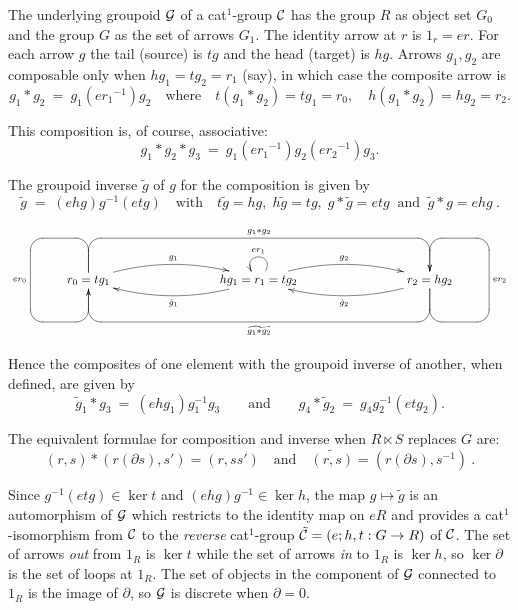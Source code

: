 The underlying groupoid $\mathcal{G}$  of a cat$^1$-group  $\mathcal{C}$ 
has the group $R$ as object set $G_0$ 
and the group $G$ as the set of arrows $G_1$. 
The identity arrow at  $r$  is  $1_r = er$. 
For each arrow  $g$  the tail (source) is  $tg$ and the head (target) is $hg$. 
Arrows  $g_1,g_2$  are composable only when  $hg_1 = tg_2 = r_1$ (say),
in which case the composite arrow is
\begin{equation} \label{eq:gpgpd-comp}
g_1 * g_2 ~=~ g_1(e{r_1}^{-1})g_2 
\quad\mbox{where}\quad
t(g_1 * g_2) = tg_1 = r_0, \quad
h(g_1 * g_2) = hg_2 = r_2.
\end{equation}

\noindent
This composition is, of course, associative:
$$
g_1*g_2*g_3 ~=~ g_1({er_1}^{-1})g_2({er_2}^{-1})g_3.
$$

\noindent
The groupoid inverse  $\tilde{g}$  of  $g$  for the composition is given by
$$
\tilde{g} \; = \; (ehg)g^{-1}(etg)
\quad \mbox{with} \quad  
t \tilde{g} = hg, \; h \tilde{g} = tg, \; g * \tilde{g} = etg  
\;\; \mbox{and} \;\;
\tilde{g} * g = ehg~.
$$  

$$
\xy
\xymatrix{
  &&&&&&&& \\
  &  r_0=tg_1 \ar `u[-1,-1] `[1,-1] `[1,0]_{er_0} `[0,0] [0,0]
            \ar@/^3ex/[rrr]^{g_1}
            \ar `u[-1,1] `[0,6]^{g_1 * g_2} [0,6]
  &&& hg_1=r_1=tg_2 \ar@/^3ex/[rrr]^{g_2}
                    \ar@/^3ex/[lll]^{\tilde{g}_1}
                    \ar@(ur,ul)_{er_1}
     &&& r_2=hg_2 \ar `d[1,1] `[-1,1] `[-1,0]_{er_2} `[0,0] [0,0]
                  \ar@/^3ex/[lll]^{\tilde{g}_2}
                  \ar `d[1,-1] `[0,-6]^{\widetilde{g_1 * g_2}} [0,-6] 
         & \\
  &&&&&&&& \\
}
\endxy
$$

\noindent
Hence the composites of one element with the groupoid inverse of another, 
when defined, are given by 
\begin{equation} \label{eq:inv-comps}
\tilde{g}_1 * g_3 ~=~ (ehg_1)g_1^{-1}g_3
\qquad\mbox{and}\qquad
g_4 * \tilde{g}_2 ~=~ g_4g_2^{-1}(etg_2).
\end{equation}

\medskip\noindent
The equivalent formulae for composition and inverse 
when  $R \ltimes S$  replaces $G$ are:
$$
(r, s) * (r (\partial s), s') = (r, ss')
\quad \mbox{and} \quad  
\widetilde{(r,s)} = (r(\partial s), s^{-1})~.
$$

Since  $g^{-1}(etg) \in \ker t$  and  $(ehg)g^{-1} \in \ker h$,
the map  $g \mapsto \tilde{g}$  is an automorphism of  $\mathcal{G}$
which restricts to the identity map on  $eR$  and
provides a cat$^1$-isomorphism from  $\mathcal{C}$  to the \emph{reverse}
cat$^1$-group $\tilde{\mathcal{C}} = (e;h,t : G \to R)$ of $\mathcal{C}$.
The set of arrows \emph{out} from  $1_R$  is  $\ker t$
while the set of arrows \emph{in} to  $1_R$  is  $\ker h$,
so  $\ker \partial$  is the set of loops at  $1_R$.
The set of objects in the component of  $\mathcal{G}$
connected to  $1_R$  is the image of  $\partial$,
so  $\mathcal{G}$  is discrete when  $\partial = 0$.

